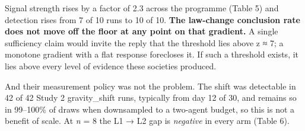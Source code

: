 \documentclass[pdflatex,sn-basic]{sn-jnl}
\begin{document}
Signal strength rises by a factor of 2.3 across the programme (Table 5) and detection rises
from 7 of 10 runs to 10 of 10. \textbf{The law-change conclusion rate does not move off the floor at
any point on that gradient.} A single sufficiency claim would invite the reply that the threshold lies above z ≈ 7; a
monotone gradient with a flat response forecloses it. If such a threshold exists, it lies
above every level of evidence these societies produced.

And their measurement policy was not the problem. The shift was detectable in 42 of 42
Study 2 gravity\_shift runs, typically from day 12 of 30, and remains so in 99--100\% of
draws when downsampled to a two-agent budget, so this is not a benefit of scale. At \emph{n} =
8 the L1 → L2 gap is \emph{negative} in every arm (Table 6).
\end{document}
